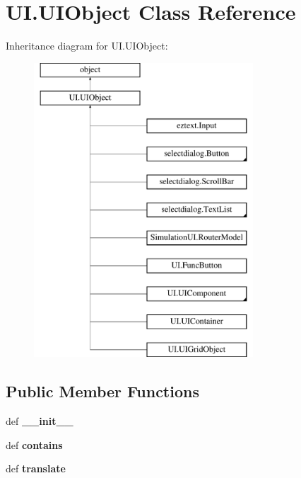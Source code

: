 \hypertarget{classUI_1_1UIObject}{\section{U\-I.\-U\-I\-Object Class Reference}
\label{classUI_1_1UIObject}
}
Inheritance diagram for U\-I.\-U\-I\-Object\-:\begin{figure}[H]
\begin{center}
\leavevmode
\includegraphics[height=11.000000cm]{classUI_1_1UIObject}
\end{center}
\end{figure}
\subsection*{Public Member Functions}
\begin{DoxyCompactItemize}
\item 
\hypertarget{classUI_1_1UIObject_a24d9ef66ab90afb40f24e2f1accd749a}{def {\bfseries \-\_\-\-\_\-init\-\_\-\-\_\-}}\label{classUI_1_1UIObject_a24d9ef66ab90afb40f24e2f1accd749a}

\item 
\hypertarget{classUI_1_1UIObject_aa4c5ce87542d83316f80a96520a93be0}{def {\bfseries contains}}\label{classUI_1_1UIObject_aa4c5ce87542d83316f80a96520a93be0}

\item 
\hypertarget{classUI_1_1UIObject_a87ca04ede1213b54c928aa6228180583}{def {\bfseries translate}}\label{classUI_1_1UIObject_a87ca04ede1213b54c928aa6228180583}

\end{DoxyCompactItemize}
